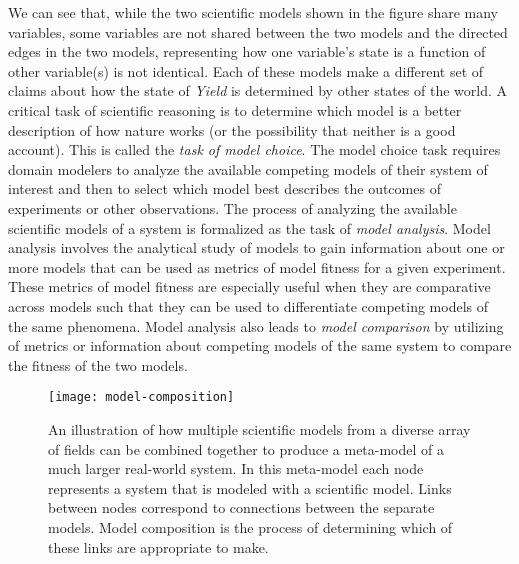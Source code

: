 We can see that, while the two scientific models shown in the figure share many variables, some variables are not shared between the two models and the directed edges in the two models, representing how one variable’s state is a function of other variable(s) is not identical.
Each of these models make a different set of claims about how the state of \emph{Yield} is determined by other states of the world.
A critical task of scientific reasoning is to determine which model is a better description of how nature works (or the possibility that neither is a good account).
This is called the \textit{task of model choice}.
The model choice task requires domain modelers to analyze the available competing models of their system of interest and then to select which model best describes the outcomes of experiments or other observations.
The process of analyzing the available scientific models of a system is formalized as the task of \emph{model analysis}.
Model analysis involves the analytical study of models to gain information about one or more models that can be used as metrics of model fitness for a given experiment.
These metrics of model fitness are especially useful when they are comparative across models such that they can be used to differentiate competing models of the same phenomena.
Model analysis also leads to \textit{model comparison} by utilizing of metrics or information about competing models of the same system to compare the fitness of the two models.

\begin{figure}[!htbp]
  \centering
  \texttt{[image: model-composition]}
  \caption[Model Composition Web]{An illustration of how multiple scientific models from a diverse array of fields can be combined together to produce a meta-model of a much larger real-world system. In this meta-model each node represents a system that is modeled with a scientific model. Links between nodes correspond to connections between the separate models. Model composition is the process of determining which of these links are appropriate to make.}
  \label{fig:composition_example}
\end{figure}

